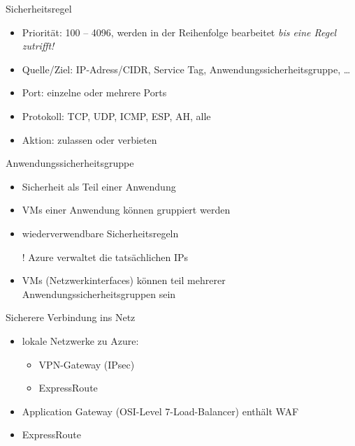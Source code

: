 \begin{flashcard}[]{Sicherheitsregel}
  \begin{itemize}
    \item Priorität: 100 -- 4096, werden in der Reihenfolge bearbeitet \emph{bis eine Regel zutrifft!}
    \item Quelle/Ziel: IP-Adress/CIDR, Service Tag, Anwendungssicherheitsgruppe, \ldots
    \item Port: einzelne oder mehrere Ports
    \item Protokoll: TCP, UDP, ICMP, ESP, AH, alle
    \item Aktion: zulassen oder verbieten
  \end{itemize}
\end{flashcard}

\begin{flashcard}[]{Anwendungssicherheitsgruppe}
  \begin{itemize}
    \item Sicherheit als Teil einer Anwendung
    \item VMs einer Anwendung können gruppiert werden
    \item wiederverwendbare Sicherheitsregeln
    \item[!] Azure verwaltet die tatsächlichen IPs
    \item VMs (Netzwerkinterfaces) können teil mehrerer Anwendungssicherheitsgruppen sein
  \end{itemize}
\end{flashcard}

\begin{flashcard}[]{Sicherere Verbindung ins Netz}
  \begin{itemize}
    \item lokale Netzwerke zu Azure:
      \begin{itemize}
        \item VPN-Gateway (IPsec)
        \item ExpressRoute
      \end{itemize}
    \item Application Gateway (OSI-Level 7-Load-Balancer) enthält WAF
    \item ExpressRoute 
  \end{itemize}
\end{flashcard}

